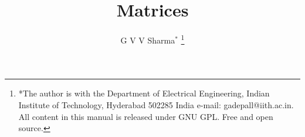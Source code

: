\documentclass[journal,12pt,twocolumn]{IEEEtran}
\begin{document}
\let\StandardTheFigure\thefigure
\let\vec\mathbf
\renewcommand{\thefigure}{\theproblem}



\def\putbox#1#2#3{\makebox[0in][l]{\makebox[#1][l]{}\raisebox{\baselineskip}[0in][0in]{\raisebox{#2}[0in][0in]{#3}}}}
     \def\rightbox#1{\makebox[0in][r]{#1}}
     \def\centbox#1{\makebox[0in]{#1}}
     \def\topbox#1{\raisebox{-\baselineskip}[0in][0in]{#1}}
     \def\midbox#1{\raisebox{-0.5\baselineskip}[0in][0in]{#1}}

\vspace{3cm}

\title{
Matrices
}
\author{ G V V Sharma$^{*}$%
	\thanks{*The author is with the Department
		of Electrical Engineering, Indian Institute of Technology, Hyderabad
		502285 India e-mail:  gadepall@iith.ac.in. All content in this manual is released under GNU GPL.  Free and open source.}
	
}	


%
%
%

% 
%
\end{document}
